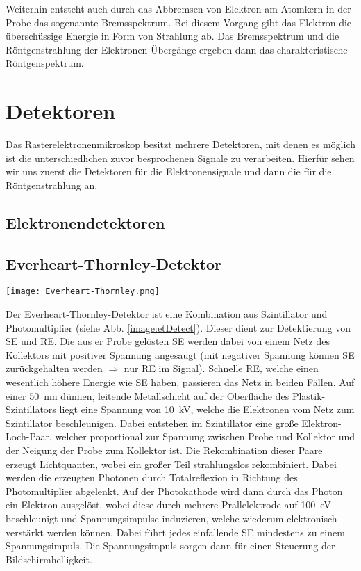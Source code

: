 Weiterhin entsteht auch durch das Abbremsen von Elektron am Atomkern in der Probe das sogenannte Bremsspektrum. Bei diesem Vorgang gibt das Elektron die überschüssige Energie in Form von Strahlung ab. Das Bremsspektrum und die Röntgenstrahlung der Elektronen-Übergänge ergeben dann das charakteristische Röntgenspektrum.
\newpage
\section{Detektoren}
\label{sec:detect}
Das Rasterelektronenmikroskop besitzt mehrere Detektoren, mit denen es möglich ist die unterschiedlichen zuvor besprochenen Signale zu verarbeiten. Hierfür sehen wir uns zuerst die Detektoren für die Elektronensignale und dann die für die Röntgenstrahlung an.  
\subsection*{Elektronendetektoren}
\subsection*{Everheart-Thornley-Detektor}
\label{sub:etDetect}
\begin{center}
    \texttt{[image: Everheart-Thornley.png]}
    \label{image:etDetect}
\end{center}
Der Everheart-Thornley-Detektor ist eine Kombination aus Szintillator und Photomultiplier (siehe Abb. \ref{image:etDetect}). Dieser dient zur Detektierung von SE und RE. Die aus er Probe gelösten SE werden dabei von einem Netz des Kollektors mit positiver Spannung angesaugt (mit negativer Spannung können SE zurückgehalten werden $\Rightarrow$ nur RE im Signal). Schnelle RE, welche einen wesentlich höhere Energie wie SE haben, passieren das Netz in beiden Fällen. Auf einer \SI{50}{\nano\metre} dünnen, leitende Metallschicht auf der Oberfläche des Plastik-Szintillators liegt eine Spannung von \SI{10} {\kilo\volt}, welche die Elektronen vom Netz zum Szintillator beschleunigen. Dabei entstehen im Szintillator eine große Elektron-Loch-Paar, welcher proportional zur Spannung zwischen Probe und Kollektor und der Neigung der Probe zum Kollektor ist. Die Rekombination dieser Paare erzeugt Lichtquanten, wobei ein großer Teil strahlungslos rekombiniert. Dabei werden die erzeugten Photonen durch Totalreflexion in Richtung des Photomultiplier abgelenkt. Auf der Photokathode wird dann durch das Photon ein Elektron ausgelöst, wobei diese durch mehrere Prallelektrode auf \SI{100}{\electronvolt} beschleunigt und Spannungsimpulse induzieren, welche wiederum elektronisch verstärkt werden können. Dabei führt jedes einfallende SE mindestens zu einem Spannungsimpuls. Die Spannungsimpuls sorgen dann für einen Steuerung der Bildschirmhelligkeit.
\newpage
